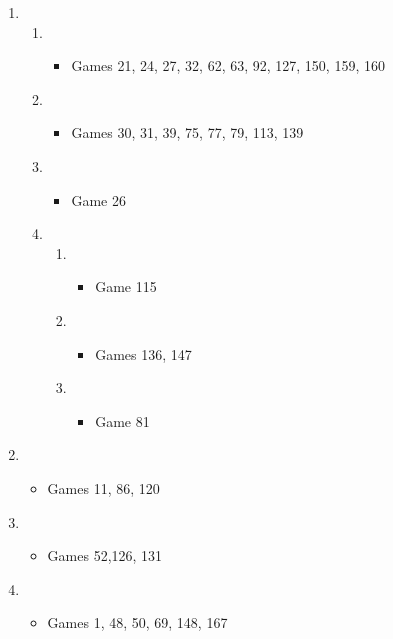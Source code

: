 \begin{enumerate}
\begin{itemize}
\end{itemize}
\item \newgame{}
\begin{enumerate}
\item {}
\begin{itemize}
\item Games 21, 24, 27, 32, 62, 63, 92, 127, 150, 159, 160
\end{itemize}
\item {}
\begin{itemize}
\item Games 30, 31, 39, 75, 77, 79, 113, 139
\end{itemize}
\item {}
\begin{itemize}
\item Game 26
\end{itemize}
\item {}
\begin{enumerate}
\item {}
\begin{itemize}
\item Game 115
\end{itemize}
\item {}
\begin{itemize}
\item Games 136, 147
\end{itemize}
\item {}
\begin{itemize}
\item Game 81
\end{itemize}
\end{enumerate}
\end{enumerate}
\item \newgame{}
\begin{itemize}
\item Games 11, 86, 120
\end{itemize}

\item \newgame{}
\begin{itemize}
\item Games 52,126, 131
\end{itemize}

\item \newgame{}
\begin{itemize}
\item Games 1, 48, 50, 69, 148, 167
\end{itemize}


\end{enumerate}
